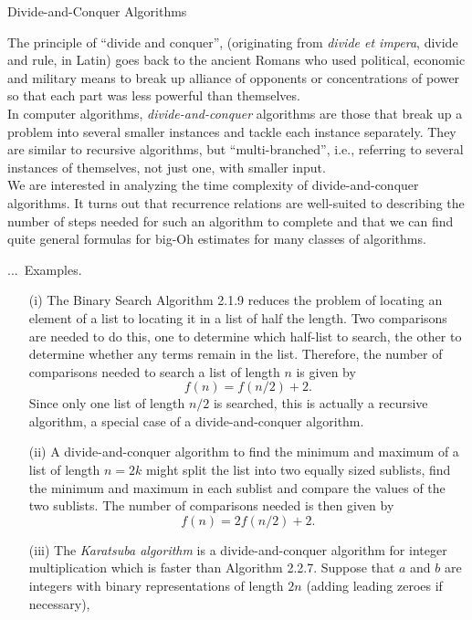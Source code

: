 \documentclass[smaller,hyperref={CJKbookmarks=true}]{beamer}
\newcounter{zhuo}[subsection]
\renewcommand{\thezhuo}{\thesection.\thesubsection.\arabic{zhuo}}
\newenvironment{EXAMPLES}{\stepcounter{zhuo}\alert{\!\thezhuo.~Examples.\,}}{}
\begin{document}
\begin{frame}{Divide-and-Conquer Algorithms}
\begin{spacing}{1.1}
The principle of ``divide and conquer'', (originating from \emph{divide et impera},
divide and rule, in Latin) goes back to the ancient Romans who used
political, economic and military means to break up alliance of opponents
or concentrations of power so that each part was less powerful than
themselves.\\[5pt]
In computer algorithms, \emph{divide-and-conquer} algorithms are those that
break up a problem into several smaller instances and tackle each instance
separately. They are similar to recursive algorithms, but ``multi-branched'',
i.e., referring to several instances of themselves, not just one, with smaller
input.\\[5pt]
We are interested in analyzing the time complexity of divide-and-conquer
algorithms. It turns out that recurrence relations are well-suited to
describing the number of steps needed for such an algorithm to complete
and that we can find quite general formulas for big-Oh estimates for many
classes of algorithms.
\end{spacing}
\newpage
\begin{spacing}{0.91}
\begin{EXAMPLES}
\begin{itemize}
  \item[(i)] The Binary Search Algorithm 2.1.9 reduces the problem of locating an element of a list to locating it in a list of half the length. Two comparisons are needed to do this, one to determine which half-list to search, the other to determine whether any terms remain in the list. Therefore, the number of comparisons needed to search a list of length $n$ is given by
      \[f(n)=f(n/2)+2.\]
      Since only one list of length $n/2$ is searched, this is actually a recursive algorithm, a special case of a divide-and-conquer algorithm.
  \item[(ii)] A divide-and-conquer algorithm to find the minimum and maximum of a list of length $n = 2k$ might split the list into two equally sized sublists, find the minimum and maximum in each sublist and compare the values of the two sublists. The number of comparisons needed is then given by
      \[f(n)=2f(n/2)+2.\]
\newpage
  \item[(iii)] The \emph{Karatsuba algorithm} is a divide-and-conquer algorithm for integer multiplication which is faster than Algorithm 2.2.7. Suppose that $a$ and $b$ are integers with binary representations of length $2n$ (adding leading zeroes if necessary),

\end{itemize}
\end{EXAMPLES}
\end{spacing}
\end{frame}
\end{document}
